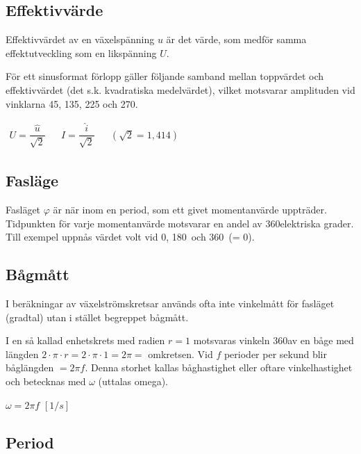 \subsection{Effektivvärde}

Effektivvärdet av en växelspänning \(u\) är det värde, som medför samma
effektutveckling som en likspänning \(U\).

För ett sinusformat förlopp gäller följande samband mellan toppvärdet och
effektivvärdet (det s.k. kvadratiska medelvärdet), vilket motsvarar amplituden
vid vinklarna 45, 135, 225 och 270\degree.

\(
\begin{array}{lllll}
U=\dfrac{\hat{u}}{\sqrt{2}} & & I=\dfrac{\hat{i}}{\sqrt{2}} & & (\sqrt{2} = 1,414)
\end{array}
\)

\subsection{Fasläge}

Fasläget \(\varphi\) är när inom en period, som ett givet momentanvärde
uppträder.
Tidpunkten för varje momentanvärde motsvarar en andel av 360\degree elektriska
grader.
Till exempel uppnås värdet volt vid 0\degree, 180\degree~och 360\degree~(= 0\degree).

\subsection{Bågmått}

I beräkningar av växelströmskretsar används ofta inte vinkelmått för fasläget
(gradtal) utan i stället begreppet bågmått.

I en så kallad enhetskrets med radien \(r = 1\) motsvaras vinkeln 360\degree av
en båge med längden \(2 \cdot \pi \cdot r= 2 \cdot \pi \cdot 1 = 2 \pi =\)
omkretsen.
Vid \(f\) perioder per sekund blir båglängden \(= 2\pi f\).
Denna storhet kallas båghastighet eller oftare vinkelhastighet och betecknas
med \(\omega\) (uttalas omega).

\(\omega= 2\pi f\) \([1/s]\)

\subsection{Period}

